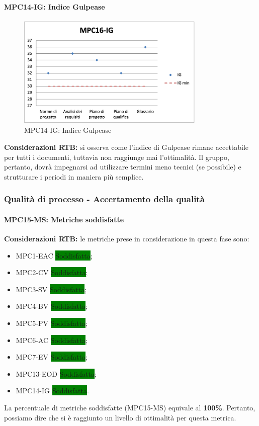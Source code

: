 \paragraph{MPC14-IG: Indice Gulpease}
\begin{figure}[h!] 
    \centering
    \includegraphics[width=0.8\textwidth]{images/MPC14-IG.png}
    \caption{MPC14-IG: Indice Gulpease}
\end{figure}
\noindent \textbf{Considerazioni RTB:} si osserva come l'indice di Gulpease rimane accettabile per tutti i documenti, tuttavia non raggiunge mai l'ottimalità. Il gruppo, pertanto, dovrà impegnarsi ad utilizzare termini meno tecnici (se possibile) e strutturare i periodi in maniera più semplice.

\subsubsection{Qualità di processo - Accertamento della qualità}
\paragraph{MPC15-MS: Metriche soddisfatte} \label{sec:accertamento delle qualita}
\noindent \textbf{Considerazioni RTB:}
le metriche prese in considerazione in questa fase sono:
\begin{itemize}
    \item MPC1-EAC \colorbox{green}{Soddisfatta};
    \item MPC2-CV \colorbox{green}{Soddisfatta};
    \item MPC3-SV \colorbox{green}{Soddisfatta};
    \item MPC4-BV \colorbox{green}{Soddisfatta};
    \item MPC5-PV \colorbox{green}{Soddisfatta};
    \item MPC6-AC \colorbox{green}{Soddisfatta};
    \item MPC7-EV \colorbox{green}{Soddisfatta};
    \item MPC13-EOD \colorbox{green}{Soddisfatta};
    \item MPC14-IG \colorbox{green}{Soddisfatta}.
\end{itemize}
\noindent La percentuale di metriche soddisfatte (MPC15-MS) equivale al \textbf{100\%}. Pertanto, possiamo dire che si è raggiunto un livello di ottimalità per questa metrica.

